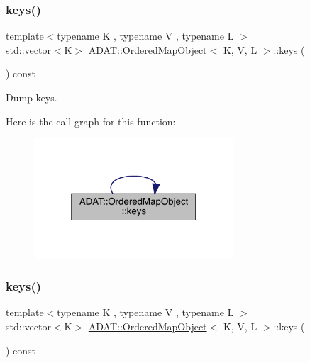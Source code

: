 \subsubsection{\texorpdfstring{keys()}{keys()}\hspace{0.1cm}{\footnotesize\ttfamily [1/2]}}
{\footnotesize\ttfamily template$<$typename K , typename V , typename L $>$ \\
std\+::vector$<$K$>$ \mbox{\hyperlink{classADAT_1_1OrderedMapObject}{A\+D\+A\+T\+::\+Ordered\+Map\+Object}}$<$ K, V, L $>$\+::keys (\begin{DoxyParamCaption}{ }\end{DoxyParamCaption}) const\hspace{0.3cm}{\ttfamily [inline]}}



Dump keys. 

Here is the call graph for this function\+:\nopagebreak
\begin{figure}[H]
\begin{center}
\leavevmode
\includegraphics[width=211pt]{db/d8c/classADAT_1_1OrderedMapObject_ad376a69c5761afe8fe44d3a24c44ba4c_cgraph}
\end{center}
\end{figure}
\mbox{\label{classADAT_1_1OrderedMapObject_ad376a69c5761afe8fe44d3a24c44ba4c}} 
\subsubsection{\texorpdfstring{keys()}{keys()}\hspace{0.1cm}{\footnotesize\ttfamily [2/2]}}
{\footnotesize\ttfamily template$<$typename K , typename V , typename L $>$ \\
std\+::vector$<$K$>$ \mbox{\hyperlink{classADAT_1_1OrderedMapObject}{A\+D\+A\+T\+::\+Ordered\+Map\+Object}}$<$ K, V, L $>$\+::keys (\begin{DoxyParamCaption}{ }\end{DoxyParamCaption}) const\hspace{0.3cm}{\ttfamily [inline]}}



